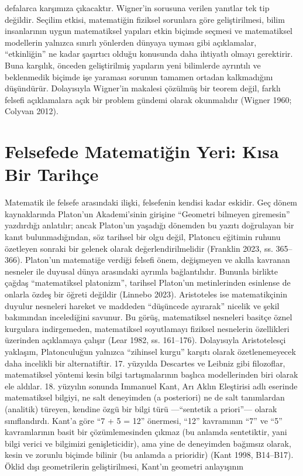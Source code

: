 defalarca karşımıza çıkacaktır. Wigner’in sorusuna verilen yanıtlar tek tip değildir. Seçilim etkisi, matematiğin fiziksel sorunlara göre geliştirilmesi, bilim insanlarının uygun matematiksel yapıları etkin biçimde seçmesi ve matematiksel modellerin yalnızca sınırlı yönlerden dünyaya uyması gibi açıklamalar, “etkinliğin” ne kadar şaşırtıcı olduğu konusunda daha ihtiyatlı olmayı gerektirir. Buna karşılık, önceden geliştirilmiş yapıların yeni bilimlerde ayrıntılı ve beklenmedik biçimde işe yaraması sorunun tamamen ortadan kalkmadığını düşündürür. Dolayısıyla Wigner’in makalesi çözülmüş bir teorem değil, farklı felsefi açıklamalara açık bir problem gündemi olarak okunmalıdır (Wigner 1960; Colyvan 2012).

\section{Felsefede Matematiğin Yeri: Kısa Bir Tarihçe}

Matematik ile felsefe arasındaki ilişki, felsefenin kendisi kadar eskidir. Geç dönem kaynaklarında Platon’un Akademi’sinin girişine “Geometri bilmeyen giremesin” yazdırdığı anlatılır; ancak Platon’un yaşadığı dönemden bu yazıtı doğrulayan bir kanıt bulunmadığından, söz tarihsel bir olgu değil, Platoncu eğitimin ruhunu özetleyen sonraki bir gelenek olarak değerlendirilmelidir (Franklin 2023, ss. 365–366). Platon’un matematiğe verdiği felsefi önem, değişmeyen ve akılla kavranan nesneler ile duyusal dünya arasındaki ayrımla bağlantılıdır. Bununla birlikte çağdaş “matematiksel platonizm”, tarihsel Platon’un metinlerinden esinlense de onlarla özdeş bir öğreti değildir (Linnebo 2023). Aristoteles ise matematikçinin duyulur nesneleri hareket ve maddeden “düşüncede ayırarak” nicelik ve şekil bakımından incelediğini savunur. Bu görüş, matematiksel nesneleri basitçe öznel kurgulara indirgemeden, matematiksel soyutlamayı fiziksel nesnelerin özellikleri üzerinden açıklamaya çalışır (Lear 1982, ss. 161–176). Dolayısıyla Aristotelesçi yaklaşım, Platonculuğun yalnızca “zihinsel kurgu” karşıtı olarak özetlenemeyecek daha incelikli bir alternatiftir. 17. yüzyılda Descartes ve Leibniz gibi filozoflar, matematiksel yöntemi kesin bilgi tartışmalarının başlıca modellerinden biri olarak ele aldılar. 18. yüzyılın sonunda Immanuel Kant, Arı Aklın Eleştirisi adlı eserinde matematiksel bilgiyi, ne salt deneyimden (a posteriori) ne de salt tanımlardan (analitik) türeyen, kendine özgü bir bilgi türü —“sentetik a priori”— olarak sınıflandırdı. Kant’a göre “7 + 5 = 12” önermesi, “12” kavramının “7” ve “5” kavramlarının basit bir çözümlemesinden çıkmaz (bu anlamda sentetiktir, yani bilgi verici ve bilgimizi genişleticidir), ama yine de deneyimden bağımsız olarak, kesin ve zorunlu biçimde bilinir (bu anlamda a prioridir) (Kant 1998, B14–B17). Öklid dışı geometrilerin geliştirilmesi, Kant’ın geometri anlayışının

